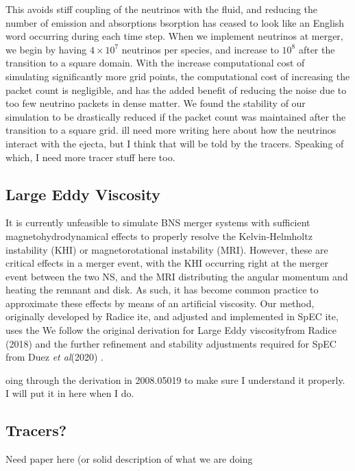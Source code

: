 \documentclass[%
twocolumn,
superscriptaddress,
nofootinbib,
 amsmath,amssymb,
 aps, prd
]{revtex4-2}
\newcommand{\alex}[1]{\color{red}{#1}}
\newcommand{\etal}[0]{\textit{et al}}
\newcommand{\lev}[0]{Large Eddy viscosity}
\begin{document}
      This avoids stiff coupling of the neutrinos with the fluid, and reducing the number of emission and absorptions {\alex absorption has ceased to look like an English word} occurring during each time step.
      When we implement neutrinos at merger, we begin by having $4\times10^7$ neutrinos per species, and increase to $10^8$ after the transition to a square domain. 
      With the increase computational cost of simulating significantly more grid points, the computational cost of increasing the packet count is negligible, and has the added benefit of reducing the noise due to too few neutrino packets in dense matter.
      We found the stability of our simulation to be drastically reduced if the packet count was maintained after the transition to a square grid.
      {\alex Will need more writing here about how the neutrinos interact with the ejecta, but I think that will be told by the tracers. Speaking of which, I need more tracer stuff here too.}

    \subsection{Large Eddy Viscosity}
    It is currently unfeasible to simulate BNS merger systems with sufficient magnetohydrodynamical effects to properly resolve the Kelvin-Helmholtz instability (KHI) or magnetorotational instability (MRI).
    However, these are critical effects in a merger event, with the KHI occurring right at the merger event between the two NS, and the MRI distributing the angular momentum and heating the remnant and disk.
    As such, it has become common practice to approximate these effects by means of an artificial viscosity.
    Our method, originally developed by Radice {\alex cite}, and adjusted and implemented in SpEC {\alex cite}, uses the 
      We follow the original derivation for \lev from Radice (2018) \cite{Radice_2018} and the further refinement and stability adjustments required for SpEC from Duez \etal (2020) \cite{Duez_2020}.

      {\alex Going through the derivation in 2008.05019 to make sure I understand it properly. I will put it in here when I do.}



    

  \subsection{Tracers?}
      Need paper here (or solid description of what we are doing
\end{document}
